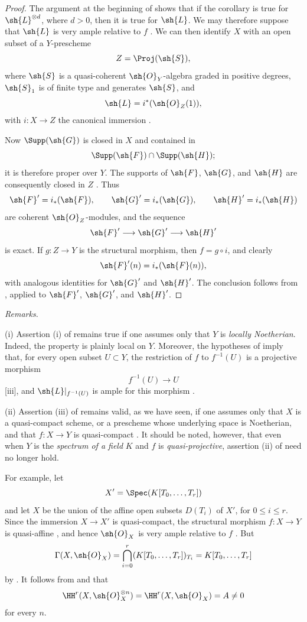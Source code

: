 \begin{proof}
The argument at the beginning of  shows that if the corollary is true for $\sh{L}^{\otimes d}$, where $d>0$, then it is true for $\sh{L}$.
We may therefore suppose that $\sh{L}$ is very ample relative to $f$ .
We can then identify $X$ with an open subset of a $Y$-prescheme
\[
  Z=\Proj(\sh{S}),
\]
where $\sh{S}$ is a quasi-coherent $\sh{O}_Y$-algebra graded in positive degrees, $\sh{S}_1$ is of finite type and generates $\sh{S}$, and
\[
  \sh{L}=i^*(\sh{O}_Z(1)),
\]
with $i:X\to Z$ the canonical immersion .

Now $\Supp(\sh{G})$ is closed in $X$ and contained in
\[
  \Supp(\sh{F})\cap\Supp(\sh{H});
\]
it is therefore proper over $Y$.
The supports of $\sh{F}$, $\sh{G}$, and $\sh{H}$ are consequently closed in $Z$ .
Thus
\[
  \sh{F}'=i_*(\sh{F}),\qquad
  \sh{G}'=i_*(\sh{G}),\qquad
  \sh{H}'=i_*(\sh{H})
\]
are coherent $\sh{O}_Z$-modules, and the sequence
\[
  \sh{F}'\longrightarrow\sh{G}'\longrightarrow\sh{H}'
\]
is exact.
If $g:Z\to Y$ is the structural morphism, then $f=g\circ i$, and clearly
\[
  \sh{F}'(n)=i_*(\sh{F}(n)),
\]
with analogous identities for $\sh{G}'$ and $\sh{H}'$.
The conclusion follows from , applied to $\sh{F}'$, $\sh{G}'$, and $\sh{H}'$.
\end{proof}

\begin{env}[2.2.5]
\label{III.2.2.5}
\emph{Remarks.}

(i) Assertion (i) of  remains true if one assumes only that $Y$ is \emph{locally Noetherian}.
Indeed, the property is plainly local on $Y$.
Moreover, the hypotheses of  imply that, for every open subset $U\subset Y$, the restriction of $f$ to $f^{-1}(U)$ is a projective morphism
\[
  f^{-1}(U)\longrightarrow U
\]
[iii], and $\sh{L}|_{f^{-1}(U)}$ is ample for this morphism .

(ii) Assertion (iii) of  remains valid, as we have seen, if one assumes only that $X$ is a quasi-compact scheme, or a prescheme whose underlying space is Noetherian, and that $f:X\to Y$ is quasi-compact .
It should be noted, however, that even when $Y$ is the \emph{spectrum of a field} $K$ and $f$ is \emph{quasi-projective}, assertion (ii) of  need no longer hold.

For example, let
\[
  X'=\Spec(K[T_0,\ldots,T_r])
\]
and let $X$ be the union of the affine open subsets $D(T_i)$ of $X'$, for $0\leq i\leq r$.
Since the immersion $X\to X'$ is quasi-compact, the structural morphism $f:X\to Y$ is quasi-affine , and hence $\sh{O}_X$ is very ample relative to $f$ .
But
\[
  \Gamma(X,\sh{O}_X)
  =\bigcap_{i=0}^r(K[T_0,\ldots,T_r])_{T_i}
  =K[T_0,\ldots,T_r]
\]
by .
It follows from  and  that
\[
  \HH^r(X,\sh{O}_X^{\otimes n})
  =\HH^r(X,\sh{O}_X)=A
  \neq0
\]
for every $n$.
\end{env}


